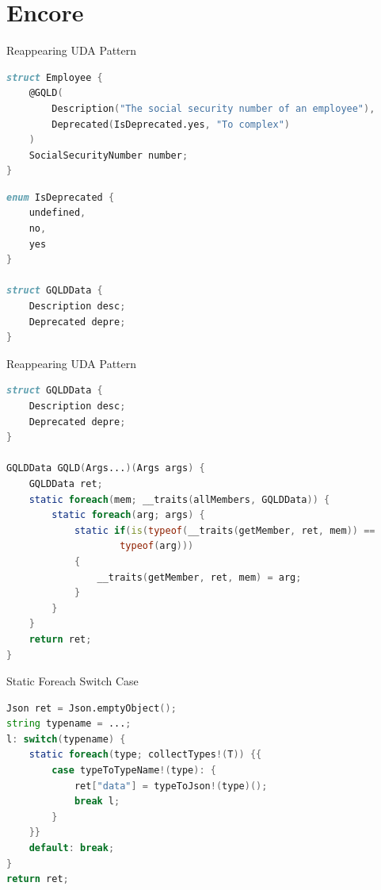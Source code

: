 \documentclass[aspectratio=169]{beamer}
\begin{document}
	\section{Encore}
	\begin{frame}[fragile]{Reappearing UDA Pattern}
\begin{lstlisting}[language=D,basicstyle=\scriptsize\ttfamily]
struct Employee {
	@GQLD(
		Description("The social security number of an employee"),
		Deprecated(IsDeprecated.yes, "To complex")
	)
	SocialSecurityNumber number;
}
\end{lstlisting}
\pause
\begin{lstlisting}[language=D,basicstyle=\scriptsize\ttfamily,firstnumber=9]
enum IsDeprecated {
	undefined,
	no,
	yes
}

struct GQLDData {
	Description desc;
	Deprecated depre;
}
\end{lstlisting}
	\end{frame}

	\begin{frame}[fragile]{Reappearing UDA Pattern}
\begin{lstlisting}[language=D,basicstyle=\footnotesize\ttfamily]
struct GQLDData {
	Description desc;
	Deprecated depre;
}

GQLDData GQLD(Args...)(Args args) {
	GQLDData ret;
	static foreach(mem; __traits(allMembers, GQLDData)) {
		static foreach(arg; args) {
			static if(is(typeof(__traits(getMember, ret, mem)) == 
					typeof(arg))) 
			{
				__traits(getMember, ret, mem) = arg;
			}
		}
	}
	return ret;
}
\end{lstlisting}
	\end{frame}

	\begin{frame}[fragile]{Static Foreach Switch Case}
\begin{lstlisting}[language=D,basicstyle=\footnotesize\ttfamily]
Json ret = Json.emptyObject();
string typename = ...;
l: switch(typename) {
	static foreach(type; collectTypes!(T)) {{
		case typeToTypeName!(type): {
			ret["data"] = typeToJson!(type)();
			break l;
		}
	}}
	default: break;
}
return ret;
\end{lstlisting}
	\end{frame}
\end{document}
